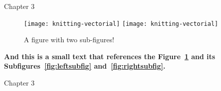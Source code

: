 
Chapter 3

\begin{figure}[htbp]
  \centering
    {\texttt{[image: knitting-vectorial]}}%
    {\texttt{[image: knitting-vectorial]}}%
  \caption{A figure with two sub-figures!}
  \label{fig:fig2subfig}
\end{figure}

\textbf{And this is a small text that references the Figure~\ref{fig:fig2subfig} and its Subfigures~\ref{fig:leftsubfig} and~\ref{fig:rightsubfig}.}

Chapter 3